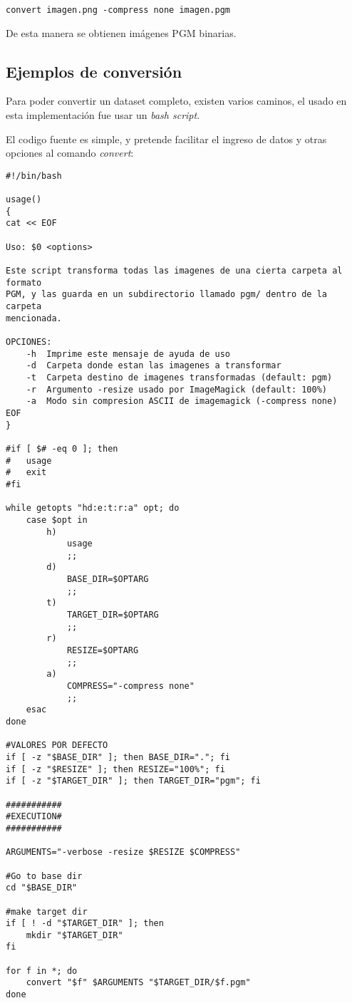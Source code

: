 \begin{verbatim}
convert imagen.png -compress none imagen.pgm
\end{verbatim}

De esta manera se obtienen imágenes PGM binarias.

\subsection{Ejemplos de conversión}
\label{ch:implementacion:sec:ejemplosdeconversion}

Para poder convertir un dataset completo, existen varios caminos, el usado en esta implementación fue usar un \emph{bash script}.

El codigo fuente es simple, y pretende facilitar el ingreso de datos y otras opciones al comando \emph{convert}:

\begin{scriptsize}
\begin{verbatim}
#!/bin/bash

usage()
{
cat << EOF

Uso: $0 <options>

Este script transforma todas las imagenes de una cierta carpeta al formato
PGM, y las guarda en un subdirectorio llamado pgm/ dentro de la carpeta
mencionada.

OPCIONES:
    -h  Imprime este mensaje de ayuda de uso
    -d  Carpeta donde estan las imagenes a transformar
    -t  Carpeta destino de imagenes transformadas (default: pgm)
    -r  Argumento -resize usado por ImageMagick (default: 100%)
    -a  Modo sin compresion ASCII de imagemagick (-compress none)
EOF
}

#if [ $# -eq 0 ]; then
#   usage
#   exit
#fi

while getopts "hd:e:t:r:a" opt; do
    case $opt in
        h)
            usage
            ;;
        d)
            BASE_DIR=$OPTARG
            ;;
        t)
            TARGET_DIR=$OPTARG
            ;;
        r)
            RESIZE=$OPTARG
            ;;
        a)
            COMPRESS="-compress none"
            ;;
    esac
done

#VALORES POR DEFECTO
if [ -z "$BASE_DIR" ]; then BASE_DIR="."; fi
if [ -z "$RESIZE" ]; then RESIZE="100%"; fi
if [ -z "$TARGET_DIR" ]; then TARGET_DIR="pgm"; fi

###########
#EXECUTION#
###########

ARGUMENTS="-verbose -resize $RESIZE $COMPRESS"

#Go to base dir
cd "$BASE_DIR"

#make target dir
if [ ! -d "$TARGET_DIR" ]; then
    mkdir "$TARGET_DIR"
fi

for f in *; do
    convert "$f" $ARGUMENTS "$TARGET_DIR/$f.pgm"
done
\end{verbatim}
\end{scriptsize}

